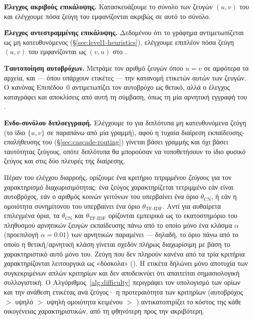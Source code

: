 \textbf{Έλεγχος ακριβούς επικάλυψης.} Κατασκευάζουμε το σύνολο των ζευγών $(u, v)$
του \texttt{} και ελέγχουμε πόσα ζεύγη του \texttt{}
εμφανίζονται ακριβώς σε αυτό το σύνολο.

\textbf{Έλεγχος αντεστραμμένης επικάλυψης.} Δεδομένου ότι το γράφημα αντιμετωπίζεται
ως μη κατευθυνόμενος (\S\ref{sec:level1-heuristics}), ελέγχουμε επιπλέον πόσα ζεύγη
$(u, v)$ του \texttt{} εμφανίζονται ως $(v, u)$ στο
\texttt{}.

\textbf{Ταυτοποίηση αυτοβρόχων.} Μετράμε τον αριθμό ζευγών όπου $u = v$ σε αμφότερα
τα αρχεία, και --- όπου υπάρχουν ετικέτες --- την κατανομή ετικετών αυτών των
ζευγών.
Ο κανόνας Επιπέδου~0 αντιμετωπίζει τον αυτοβρόχο ως θετικό, αλλά ο
έλεγχος καταγράφει και αποκλίσεις από αυτή τη σύμβαση, όπως τη μία αρνητική
εγγραφή του .

\textbf{Ενδο-συνόλου διπλοεγγραφή.} Ελέγχουμε το \texttt{} για
διπλότυπα μη κατευθυνόμενα ζεύγη (το ίδιο $\{u, v\}$ σε παραπάνω από μία γραμμή),
αφού η τυχαία διαίρεση εκπαίδευσης-επαλήθευσης του 
(\S\ref{sec:cascade-routing}) γίνεται βάσει γραμμής και όχι βάσει ταυτότητας
ζεύγους, οπότε διπλότυπα θα μπορούσαν να τοποθετήσουν το ίδιο φυσικό ζεύγος και
στις δύο πλευρές της διαίρεσης.

Πέραν του ελέγχου διαρροής, ορίζουμε ένα κριτήριο \textit{τετριμμένου ζεύγους} για
τον χαρακτηρισμό διαχωρισιμότητας: ένα ζεύγος χαρακτηρίζεται τετριμμένο εάν είναι
αυτοβρόχος, εάν ο αριθμός κοινών γειτόνων του υπερβαίνει ένα όριο $\theta_{\mathrm{CN}}$,
ή εάν η ομοιότητα συνημίτονου  του υπερβαίνει ένα όριο
$\theta_{\mathrm{TF\text{-}IDF}}$.
Αντί για αυθαίρετα επιλεγμένα όρια, τα
$\theta_{\mathrm{CN}}$ και $\theta_{\mathrm{TF\text{-}IDF}}$ ορίζονται εμπειρικά ως
το εκατοστημόριο του πληθυσμού \textit{αρνητικών} ζευγών εκπαίδευσης πάνω από το
οποίο μόνο ένα κλάσμα $\alpha$ (προεπιλογή $\alpha = 0.01$) των αρνητικών παραμένει
— δηλαδή, το όριο πάνω από το οποίο η θετική/αρνητική κλάση γίνεται σχεδόν πλήρως
διαχωρίσιμη με βάση το χαρακτηριστικό αυτό μόνο του.
Ζεύγη που δεν πληρούν κανένα από τα τρία κριτήρια χαρακτηρίζονται λειτουργικά ως
«δύσκολα» (). Η ετικέτα δηλώνει μόνο αποτυχία των συγκεκριμένων απλών
κριτηρίων και δεν αποδεικνύει ότι απαιτείται σημασιολογική συλλογιστική.
Ο
Αλγόριθμος~\ref{alg:difficulty} περιγράφει τον υπολογισμό των ορίων και την
ανάθεση ετικέτας ανά ζεύγος· η προτεραιότητα των κριτηρίων (αυτοβρόχος $>$ υψηλό
 $>$ υψηλή ομοιότητα κειμένου $>$ ) αντικατοπτρίζει το κόστος της
κάθε οικογένειας χαρακτηριστικών, από τη φθηνότερη προς την ακριβότερη.

